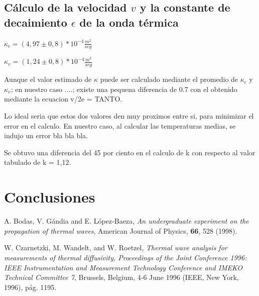 \documentclass[twoside,twocolumn,a4paper]{article}
\begin{document}
\subsection{C\'alculo de la velocidad $v$ y la constante de decaimiento $\epsilon$ de la onda t\'ermica}


$\kappa_{\epsilon} = (4,97 \pm 0,8) * 10^{-4} \frac{m^{2}}{seg}$ 

$\kappa_{v} = (1,24 \pm 0,8) * 10^{-4} \frac{m^{2}}{seg}$

Aunque el valor estimado de $\kappa$ puede ser calculado mediante el promedio de $\kappa_{\epsilon}$ y $\kappa_{v}$; en nuestro caso ....; existe una pequena diferencia de 0.7 con el obtenido mediante la ecuacion v/2e = TANTO.

Lo ideal seria que estos dos valores den muy proximos entre si, para minimizar el error en el calculo. En nuestro caso, al calcular las temperaturas medias, se indujo un error bla bla bla.

Se obtuvo una diferencia del 45 por ciento en el calculo de k con respecto al valor tabulado de k = 1,12.




\section{Conclusiones}


\newpage
\begin{thebibliography}{99} %


 A. Bodas, V. G\'andia and E. L\'opez-Baeza, \textit{An undergraduate experiment on the propagation of thermal waves}, American Journal of Physics, \textbf{66}, 528 (1998).

 W. Czarnetzki, M. Wandelt, and W. Roetzel, \textit{Thermal wave analysis for measurements of thermal diffusivity, Proceedings of the Joint Conference 1996: IEEE Instrumentation and Measurement Technology Conference and IMEKO Technical Committee 7}, Brussels, Belgium, 4-6 June 1996 (IEEE, New York, 1996), p\'ag. 1195.
 
\end{thebibliography}


\end{document}
